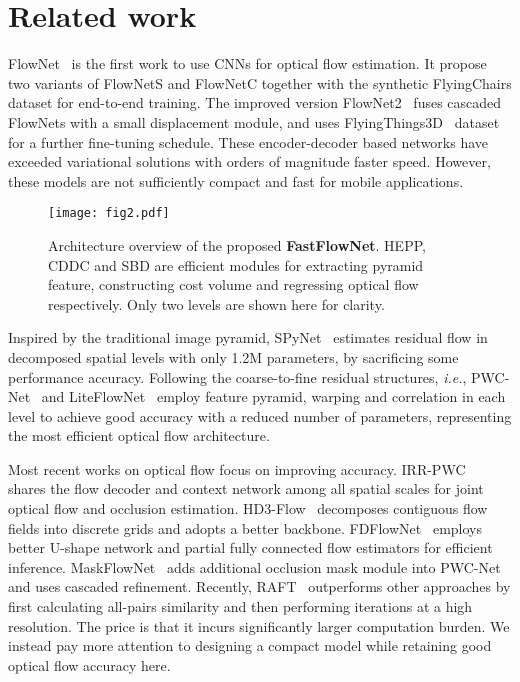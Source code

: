 \documentclass[letterpaper, 10 pt, conference]{ieeeconf}
\begin{document}
\section{Related work}

FlowNet~\cite{Fischer_2015} is the first work to use CNNs for optical flow estimation. It propose two variants of FlowNetS and FlowNetC together with the synthetic FlyingChairs dataset for end-to-end training. The improved version 
FlowNet2~\cite{Ilg_2017} fuses cascaded FlowNets with a small displacement module, and uses FlyingThings3D~\cite{Mayer_2016} dataset for a further fine-tuning schedule. These encoder-decoder based networks have exceeded variational solutions with orders of magnitude faster speed. However, these models are not sufficiently compact and fast for mobile applications. 
\begin{figure*}[t]
	\centering
	\texttt{[image: fig2.pdf]}
	\caption{Architecture overview of the proposed \textbf{FastFlowNet}. HEPP, CDDC and SBD are efficient modules for extracting pyramid feature, constructing cost volume and regressing optical flow respectively. Only two levels are shown here for clarity.}
	\label{fig2}
\end{figure*}

Inspired by the traditional image pyramid, SPyNet~\cite{Ranjan_2017} estimates residual flow in decomposed spatial levels with only 1.2M parameters, by 
sacrificing some performance accuracy. 
Following the coarse-to-fine residual structures, \textit{i.e.}, PWC-Net~\cite{Sun_2018_CVPR} and LiteFlowNet~\cite{Hui_2018_CVPR} employ feature pyramid, warping and correlation in each level to achieve good 
accuracy with a reduced number of  parameters, representing the most efficient optical flow architecture. 

Most recent works on optical flow focus on improving accuracy.
IRR-PWC~\cite{Hur_2019} shares the flow decoder and context network among all spatial scales for joint optical flow and occlusion estimation. HD3-Flow~\cite{Yin_2019} decomposes contiguous flow fields into discrete grids and adopts a better backbone. FDFlowNet~\cite{Kong_2020} employs better U-shape network and partial fully connected flow estimators for efficient inference. MaskFlowNet~\cite{zhao2020maskflownet} adds additional occlusion mask module into PWC-Net~\cite{Sun_2018_CVPR} and uses 
cascaded refinement. Recently, RAFT~\cite{teed2020raft} outperforms other approaches by first calculating all-pairs similarity and then performing iterations at a high resolution. The price is that 
it incurs significantly larger 
computation burden. 
We instead  pay more attention to designing a compact model while retaining good optical flow accuracy here. 
\end{document}
